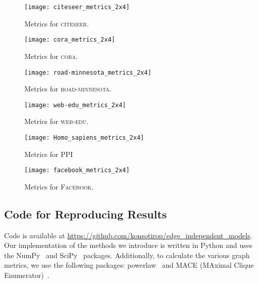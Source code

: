 \begin{figure}
\centering
\texttt{[image: citeseer\_metrics\_2x4]}
\caption{Metrics for \textsc{citeseer}.}
\label{fig:citeseer_metrics}
\end{figure}

\begin{figure}
\centering
\texttt{[image: cora\_metrics\_2x4]}
\caption{Metrics for \textsc{cora}.}
\label{fig:cora_metrics}
\end{figure}

\begin{figure}
\centering
\texttt{[image: road-minnesota\_metrics\_2x4]}
\caption{Metrics for \textsc{road-minnesota}.}
\label{fig:road-minnesota_metrics}
\end{figure}

\begin{figure}
\centering
\texttt{[image: web-edu\_metrics\_2x4]}
\caption{Metrics for \textsc{web-edu}.}
\label{fig:web-edu_metrics}
\end{figure}

\begin{figure}
\centering
\texttt{[image: Homo\_sapiens\_metrics\_2x4]}
\caption{Metrics for \textsc{PPI}}
\label{fig:ppi_metrics}
\end{figure}

\begin{figure}
\centering
\texttt{[image: facebook\_metrics\_2x4]}
\caption{Metrics for \textsc{Facebook}.}
\label{fig:facebook_metrics}
\end{figure}

\subsection{Code for Reproducing Results}
Code is available at \url{https://github.com/konsotirop/edge_independent_models}. Our implementation of the methods we introduce is written in Python and uses the NumPy~\cite{harris2020array} and SciPy~\cite{2020SciPy-NMeth} packages. Additionally, to calculate the various graph metrics, we use the following packages: powerlaw~\cite{alstott2014powerlaw} and MACE (MAximal Clique Enumerator)~\cite{takeaki2012implementation}.
